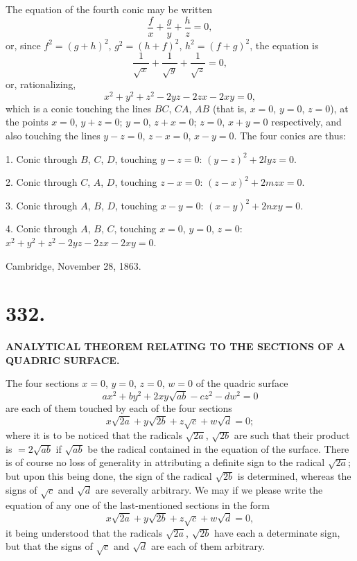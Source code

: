 \documentclass[11pt,a4paper]{article}
\begin{document}
The equation of the fourth conic may be written
\[
\frac{f}{x} + \frac{g}{y} + \frac{h}{z} = 0,
\]
or, since $f^2 = (g+h)^2$, $g^2 = (h+f)^2$, $h^2 = (f+g)^2$, the equation is
\[
\frac{1}{\sqrt{x}} + \frac{1}{\sqrt{y}} + \frac{1}{\sqrt{z}} = 0,
\]
or, rationalizing,
\[
x^2 + y^2 + z^2 - 2yz - 2zx - 2xy = 0,
\]
which is a conic touching the lines $BC$, $CA$, $AB$ (that is, $x=0$, $y=0$, $z=0$), at the points $x=0$, $y+z=0$; $y=0$, $z+x=0$; $z=0$, $x+y=0$ respectively, and also touching the lines $y-z=0$, $z-x=0$, $x-y=0$. The four conics are thus:

1. Conic through $B$, $C$, $D$, touching $y-z=0$: $(y-z)^2 + 2lyz = 0$.

2. Conic through $C$, $A$, $D$, touching $z-x=0$: $(z-x)^2 + 2mzx = 0$.

3. Conic through $A$, $B$, $D$, touching $x-y=0$: $(x-y)^2 + 2nxy = 0$.

4. Conic through $A$, $B$, $C$, touching $x=0$, $y=0$, $z=0$: $x^2+y^2+z^2-2yz-2zx-2xy=0$.

\begin{flushright}
Cambridge, November 28, 1863.
\end{flushright}

\newpage
\section*{332.}

\begin{center}
\textbf{ANALYTICAL THEOREM RELATING TO THE SECTIONS OF A QUADRIC SURFACE.}
\end{center}


\bigskip

\noindent The four sections $x=0$, $y=0$, $z=0$, $w=0$ of the quadric surface
\[
ax^2 + by^2 + 2xy\sqrt{ab} - cz^2 - dw^2 = 0
\]
are each of them touched by each of the four sections
\[
x\sqrt{2a} + y\sqrt{2b} + z\sqrt{c} + w\sqrt{d} = 0;
\]
where it is to be noticed that the radicals $\sqrt{2a}$, $\sqrt{2b}$ are such that their product is $=2\sqrt{ab}$ if $\sqrt{ab}$ be the radical contained in the equation of the surface. There is of course no loss of generality in attributing a definite sign to the radical $\sqrt{2a}$; but upon this being done, the sign of the radical $\sqrt{2b}$ is determined, whereas the signs of $\sqrt{c}$ and $\sqrt{d}$ are severally arbitrary. We may if we please write the equation of any one of the last-mentioned sections in the form
\[
x\sqrt{2a} + y\sqrt{2b} + z\sqrt{c} + w\sqrt{d} = 0,
\]
it being understood that the radicals $\sqrt{2a}$, $\sqrt{2b}$ have each a determinate sign, but that the signs of $\sqrt{c}$ and $\sqrt{d}$ are each of them arbitrary.
\end{document}
